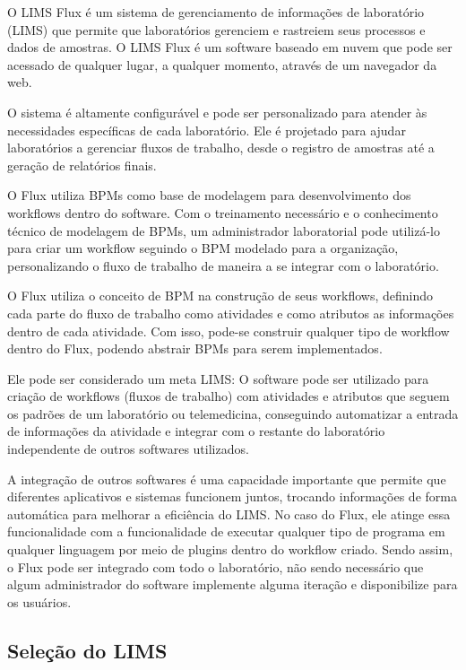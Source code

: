 
O LIMS Flux é um sistema de gerenciamento de informações de laboratório (LIMS) que permite que laboratórios gerenciem e rastreiem seus processos e dados de amostras. O LIMS Flux é um software baseado em nuvem que pode ser acessado de qualquer lugar, a qualquer momento, através de um navegador da web.

O sistema é altamente configurável e pode ser personalizado para atender às necessidades específicas de cada laboratório. Ele é projetado para ajudar laboratórios a gerenciar fluxos de trabalho, desde o registro de amostras até a geração de relatórios finais.

O Flux utiliza BPMs como base de modelagem para desenvolvimento dos workflows dentro do software. Com o treinamento necessário e o conhecimento técnico de modelagem de BPMs, um administrador laboratorial pode utilizá-lo para criar um workflow seguindo o BPM modelado para a organização, personalizando o fluxo de trabalho de maneira a se integrar com o laboratório.

O Flux utiliza o conceito de BPM na construção de seus workflows, definindo cada parte do fluxo de trabalho como atividades e como atributos as informações dentro de cada atividade. Com isso, pode-se construir qualquer tipo de workflow dentro do Flux, podendo abstrair BPMs para serem implementados.

Ele pode ser considerado um meta LIMS: O software pode ser utilizado para criação de workflows (fluxos de trabalho) com atividades e atributos que seguem os padrões de um laboratório ou telemedicina, conseguindo automatizar a entrada de informações da atividade e integrar com o restante do laboratório independente de outros softwares utilizados.

A integração de outros softwares é uma capacidade importante que permite que diferentes aplicativos e sistemas funcionem juntos, trocando informações de forma automática para melhorar a eficiência do LIMS. No caso do Flux, ele atinge essa funcionalidade com a funcionalidade de executar qualquer tipo de programa em qualquer linguagem por meio de plugins dentro do workflow criado.
Sendo assim, o Flux pode ser integrado com todo o laboratório, não sendo necessário que algum administrador do software implemente alguma iteração e disponibilize para os usuários.


\subsection{Seleção do LIMS}

